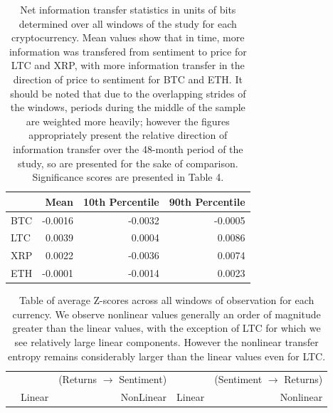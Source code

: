 \documentclass[]{rsos}%
\begin{document}
{\begin{table}[!htb]
\begin{tabular}{lrrrr}
    \end{tabular}
    
  \end{table}

  \begin{table}[!htb]
    \label{t.table3}
    \caption{ Net information transfer statistics in units of bits determined over all windows of the study for each cryptocurrency. Mean values show that in time, more information was transfered from sentiment to price for LTC and XRP, with more information transfer in the direction of price to sentiment for BTC and ETH. It should be noted that due to the overlapping strides of the windows, periods during the middle of the sample are weighted more heavily; however the figures appropriately present the relative direction of information transfer over the 48-month period of the study, so are presented for the sake of comparison. Significance scores are presented in Table {\color{blue}4}.}

    
    \begin{tabular}{lrrr}
     {} &    Mean &  10th Percentile &  90th Percentile \\
     \hline 
     BTC & -0.0016 &          -0.0032 &          -0.0005 \\
     LTC &  0.0039 &           0.0004 &           0.0086 \\
     XRP &  0.0022 &          -0.0036 &           0.0074 \\
     ETH & -0.0001 &          -0.0014 &           0.0023 \\
    \end{tabular}
  
  \end{table}


  \begin{table}[!htb]
    \label{t.table4}
    \caption{Table of average Z-scores across all windows of observation for each currency. We observe nonlinear values generally an order of magnitude greater than the linear values, with the exception of LTC for which we see relatively large linear components. However the nonlinear transfer entropy remains considerably larger than the linear values even for LTC.}
    
    \begin{tabular}{lrrrr}
      {} & {} & (Returns $\rightarrow$ Sentiment) & {} & (Sentiment $\rightarrow$  Returns)  \\
      {} & Linear  &  NonLinear  &  Linear  &  Nonlinear  \\
      \hline 


\end{tabular}
\end{table}}
\end{document}
